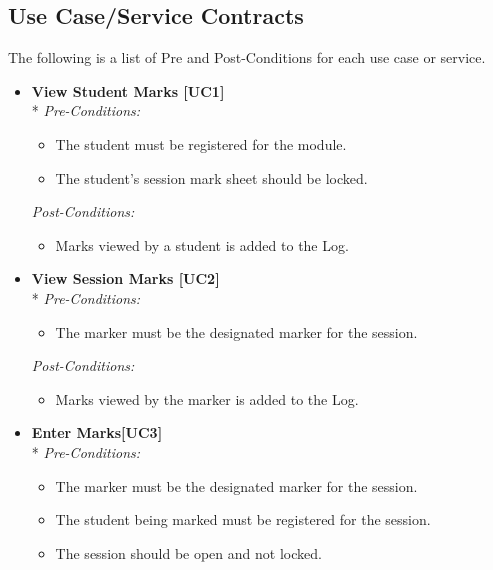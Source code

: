 \documentclass[a4paper]{article}
\begin{document}
		\subsection{Use Case/Service Contracts}
			
			The following is a list of Pre and Post-Conditions for each use case or service.
			\begin{itemize}
			
				\item 	\textbf{View Student Marks [UC1]}\\*
						\textit{Pre-Conditions:}
								\begin{itemize}
									\item The student must be registered for the module.
									\item The student's session mark sheet should be locked.
								\end{itemize}
								
						\textit{Post-Conditions:}
								\begin{itemize}
									\item Marks viewed by a student is added to the Log.
								\end{itemize}
														
				\item	\textbf{View Session Marks [UC2]}\\*
						\textit{Pre-Conditions:}
								\begin{itemize}
									\item The marker must be the designated marker for the session.
								\end{itemize}
								
						\textit{Post-Conditions:}
								\begin{itemize}
									\item Marks viewed by the marker is added to the Log.
								\end{itemize}
														
				\item	\textbf{Enter Marks[UC3]}\\*
						\textit{Pre-Conditions:}
								\begin{itemize}
									\item The marker must be the designated marker for the session.
									\item The student being marked must be registered for the session.
									\item The session should be open and not locked.
								\end{itemize}
								

\end{itemize}
\end{document}
